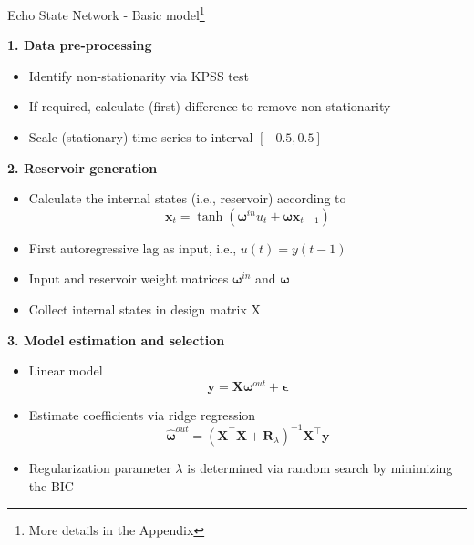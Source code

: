 \documentclass[aspectratio=169]{beamer}
\begin{document}
\begin{frame}[t]{Echo State Network - Basic model\footnote{More details in the Appendix}}
    \begin{minipage}[t]{0.33\textwidth}
        \vspace{0pt}
        \textbf{1. Data pre-processing}
        \begin{itemize}
            \item Identify non-stationarity via KPSS test
			\item If required, calculate (first) difference to remove non-stationarity
			\item Scale (stationary) time series to interval $[-0.5, 0.5]$
        \end{itemize}
    \end{minipage}%
    \hfill
    \begin{minipage}[t]{0.33\textwidth}
        \vspace{0pt}
        \textbf{2. Reservoir generation}
        \begin{itemize}
            \item Calculate the internal states (i.e., reservoir) according to
				\begin{equation*}
					\mathbf{x}_{t} = \tanh \left( {\boldsymbol{\omega}^{in}} u_{t} + \boldsymbol{\omega} \mathbf{x}_{t-1} \right)
				\end{equation*}
			\item First autoregressive lag as input, i.e., $u(t) = y(t-1)$
			\item Input and reservoir weight matrices $\boldsymbol{\omega}^{in}$ and $\boldsymbol{\omega}$
			\item Collect internal states in design matrix X
        \end{itemize}
    \end{minipage}
    \hfill
    \begin{minipage}[t]{0.33\textwidth}
        \vspace{0pt}
        \textbf{3. Model estimation and selection}
        \begin{itemize}
            \item Linear model
            	\begin{equation*}
            	\mathbf{y} = \mathbf{X} \boldsymbol{\omega}^{out} + \boldsymbol{\epsilon}
				\end{equation*}
			\item Estimate coefficients via ridge regression
				\begin{equation*}
				\boldsymbol{\hat{\omega}}^{out} = (\mathbf{X}^\top \mathbf{X} + \mathbf{R}_{\lambda})^{-1}\mathbf{X}^\top\mathbf{y}
				\end{equation*}
			\item Regularization parameter $\lambda$ is determined via random search by minimizing the BIC
        \end{itemize}
    \end{minipage}
\end{frame}
\end{document}
